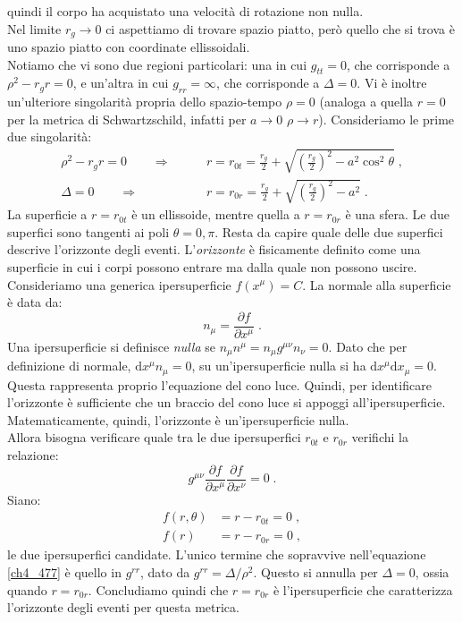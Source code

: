 \documentclass[12pt,a4paper]{report}
\theoremstyle{definition}
\newcommand{\diff}[1][]{\mathrm{d}#1}
\begin{document}
quindi il corpo ha acquistato una velocità di rotazione non nulla. \\
Nel limite $r_g\to 0$ ci aspettiamo di trovare spazio piatto, però quello che si trova è uno spazio piatto con coordinate ellissoidali. \\
Notiamo che vi sono due regioni particolari: una in cui $g_{tt}=0$, che corrisponde a $\rho^2-r_gr=0$, e un'altra in cui $g_{rr}=\infty$, che corrisponde a $\Delta=0$. Vi è inoltre un'ulteriore singolarità propria dello spazio-tempo $\rho=0$ (analoga a quella $r=0$ per la metrica di Schwartzschild, infatti per $a\to 0$ $\rho\to r$). Consideriamo le prime due singolarità:
\begin{align}
\rho^2-r_gr=0\qquad \Longrightarrow\qquad &r=r_{0t}=\frac{r_g}{2}+\sqrt{\left(\frac{r_g}{2}\right)^2-a^2\cos^2\theta}\;, \\
\Delta =0\qquad \Longrightarrow\qquad &r=r_{0r}=\frac{r_g}{2}+\sqrt{\left(\frac{r_g}{2}\right)^2-a^2}\;. \label{ch4_477}
\end{align}
La superficie a $r=r_{0t}$ è un ellissoide, mentre quella a $r=r_{0r}$ è una sfera. Le due superfici sono tangenti ai poli $\theta=0,\pi$. Resta da capire quale delle due superfici descrive l'orizzonte degli eventi. L'\emph{orizzonte} è fisicamente definito come una superficie in cui i corpi possono entrare ma dalla quale non possono uscire. \\
Consideriamo una generica ipersuperficie $f(x^{\mu})=C$. La normale alla superficie è data da:
$$
n_{\mu}=\frac{\partial f}{\partial x^{\mu}}\;.
$$
Una ipersuperficie si definisce \emph{nulla} se $n_{\mu}n^{\mu}=n_{\mu}g^{\mu\nu}n_{\nu}=0$. Dato che per definizione di normale, $\diff{x^{\mu}}n_{\mu}=0$, su un'ipersuperficie nulla si ha $\diff{x^{\mu}}\diff{x_{\mu}}=0$. Questa rappresenta proprio l'equazione del cono luce. Quindi, per identificare l'orizzonte è sufficiente che un braccio del cono luce si appoggi all'ipersuperficie. Matematicamente, quindi, l'orizzonte è un'ipersuperficie nulla. \\
Allora bisogna verificare quale tra le due ipersuperfici $r_{0t}$  e $r_{0r}$ verifichi la relazione:
\begin{equation}
g^{\mu\nu}\frac{\partial f}{\partial x^{\mu}}\frac{\partial f}{\partial x^{\nu}}=0\;.
\end{equation}
Siano:
\begin{align*}
f(r,\theta)&=r-r_{0t}=0\;, \\
f(r) &= r-r_{0r}=0\;,
\end{align*}
le due ipersuperfici candidate. L'unico termine che sopravvive nell'equazione \eqref{ch4_477} è quello in $g^{rr}$, dato da $g^{rr}=\Delta/\rho^2$. Questo si annulla per $\Delta=0$, ossia quando $r=r_{0r}$. Concludiamo quindi che $r=r_{0r}$ è l'ipersuperficie che caratterizza l'orizzonte degli eventi per questa metrica. \\
\end{document}
